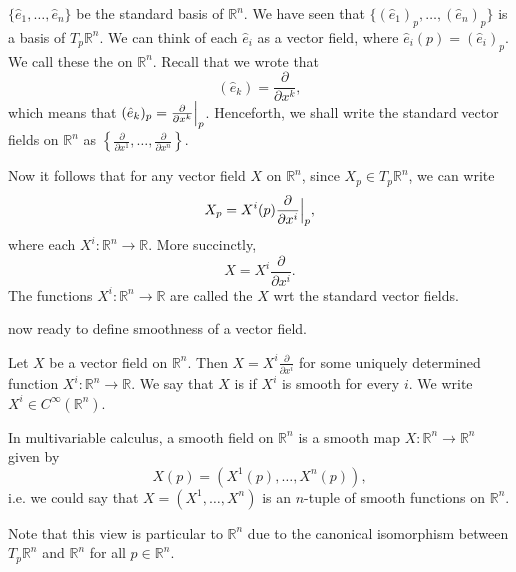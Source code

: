 \documentclass[notoc,notitlepage]{tufte-book}
\begin{document}
 $\{ \hat{e}_1, \ldots, \hat{e}_n \}$ be the standard basis of $\mathbb{R}^n$.
We have seen that $\{ (\hat{e}_1)_p, \ldots, (\hat{e}_n)_p \}$ is a basis of $T_p \mathbb{R}^n$.
We can think of each $\hat{e}_i$ as a vector field, where $\hat{e}_i(p) = (\hat{e}_i)_p$. We
call these the  on $\mathbb{R}^n$. Recall that we wrote that
\begin{equation}\label{eq:standard_basis_for_standard_vector_fields}
  (\hat{e}_k) = \frac{\partial}{\partial x^k},
\end{equation}
which means that $(\hat{e}_k)_p = \frac{\partial}{\partial x^k} \Big|_{p}^{}$. Henceforth, we shall
write the standard vector fields on $\mathbb{R}^n$ as
$\left\{ \frac{\partial}{\partial x^1}, \ldots, \frac{\partial}{\partial x^n} \right\}$.

Now it follows that for any vector field $X$ on $\mathbb{R}^n$, since $X_p \in T_p \mathbb{R}^n$,
we can write
\begin{equation*}
  X_p = X^i (p) \frac{\partial}{\partial x^i} \Big|_{p}^{},
\end{equation*}
where each $X^i : \mathbb{R}^n \to \mathbb{R}$. More succinctly,
\begin{equation*}
  X = X^i \frac{\partial}{\partial x^i}.
\end{equation*}
The functions $X^i : \mathbb{R}^n \to \mathbb{R}$ are called the  $X$ wrt the standard vector fields.

 now ready to define smoothness of a vector field.

\begin{defn}\label{defn:smooth_vector_fields}
  Let $X$ be a vector field on $\mathbb{R}^n$. Then $X = X^i \frac{\partial}{\partial x^i}$ for
  some uniquely determined function $X^i : \mathbb{R}^n \to \mathbb{R}$. We say that $X$ is
   if $X^i$ is smooth for every $i$. We write $X^i \in C^\infty(\mathbb{R}^n)$.
\end{defn}

\begin{remark}
  In multivariable calculus, a smooth field on $\mathbb{R}^n$ is a smooth map $X : \mathbb{R}^n
  \to \mathbb{R}^n$ given by
  \begin{equation*}
    X(p) = (X^1(p), \ldots, X^n(p)),
  \end{equation*}
  i.e. we could say that $X = (X^1, \ldots, X^n)$ is an $n$-tuple of smooth functions on
  $\mathbb{R}^n$.

  Note that this view is particular to $\mathbb{R}^n$ due to the canonical isomorphism between
  $T_p \mathbb{R}^n$ and $\mathbb{R}^n$ for all $p \in \mathbb{R}^n$.
\end{remark}
\end{document}
